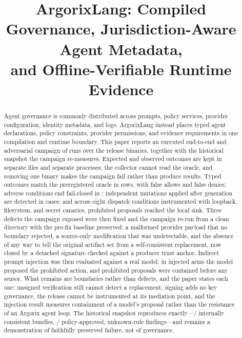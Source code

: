 \documentclass[conference]{IEEEtran}
\title{ArgorixLang: Compiled Governance, Jurisdiction-Aware Agent Metadata,\\
and Offline-Verifiable Runtime Evidence}
\author{
\IEEEauthorblockN{
Gustavo Venegas\IEEEauthorrefmark{1},
Edison Vazquez\IEEEauthorrefmark{1},
Danilo Naranjo\IEEEauthorrefmark{2},
Benjamin Gonzalez\IEEEauthorrefmark{1}}
\IEEEauthorblockA{
\IEEEauthorrefmark{1}Chilean Chamber of Artificial Intelligence\quad
\IEEEauthorrefmark{2}Ocular\\
\texttt{\footnotesize gustavo@gobiernoia.cl,\ edison@jhedai.com,\space
dan@ocularsolution.com,\ ben@nirvana-ai.com}}
}
\begin{document}
\maketitle

\begin{abstract}
Agent governance is commonly distributed across prompts, policy services,
provider configuration, identity metadata, and logs.  ArgorixLang instead
places typed agent declarations, policy constraints, provider permissions, and
evidence requirements in one compilation and runtime boundary.  This paper
reports an executed end-to-end and adversarial campaign of \campaignRows{}
runs over the release binaries, together with the historical snapshot the
campaign re-measures.  Expected and observed outcomes are kept in separate
files and separate processes: the collector cannot read the oracle, and
removing one binary makes the campaign fail rather than produce results.
Typed outcomes match the preregistered oracle in \campaignAccuracy{} rows, with
\campaignFalseAllows{} false allows and \campaignFalseDenies{} false denies;
adverse conditions end fail-closed in \campaignFailClosed{}; independent
mutations applied after generation are detected in \campaignTamper{} cases; and
across eight dispatch conditions instrumented with loopback, filesystem, and
secret canaries, \campaignSinkHits{} prohibited proposals reached the local
sink.  Three defects the campaign exposed were then fixed and the campaign re-run
from a clean directory with the pre-fix baseline preserved: a malformed provider
payload that no boundary rejected, a source-only modification that was
undetectable, and the absence of any way to tell the original artifact set from
a self-consistent replacement, now closed by a detached signature checked
against a producer trust anchor.  Indirect prompt injection was then evaluated
against a real model: in \promptInjectionAttackSuccess{} injected arms the model
proposed the prohibited action, and \promptInjectionContainment{} prohibited
proposals were contained before any sensor.  What remains are boundaries rather
than defects, and the paper states each one: unsigned verification still cannot
detect a replacement, signing adds no key governance, the release cannot be
instrumented at its mediation point, and the injection result measures
containment of a model's proposal rather than the resistance of an Argorix
agent loop.  The historical snapshot reproduces
exactly---\snapshotVerified{}/\snapshotComplete{} internally consistent bundles,
\snapshotApproved{}/\snapshotComplete{} policy-approved, \snapshotUnknownTotal{}
unknown-rule findings---and remains a demonstration of faithfully preserved
failure, not of governance.
\end{abstract}
\end{document}
